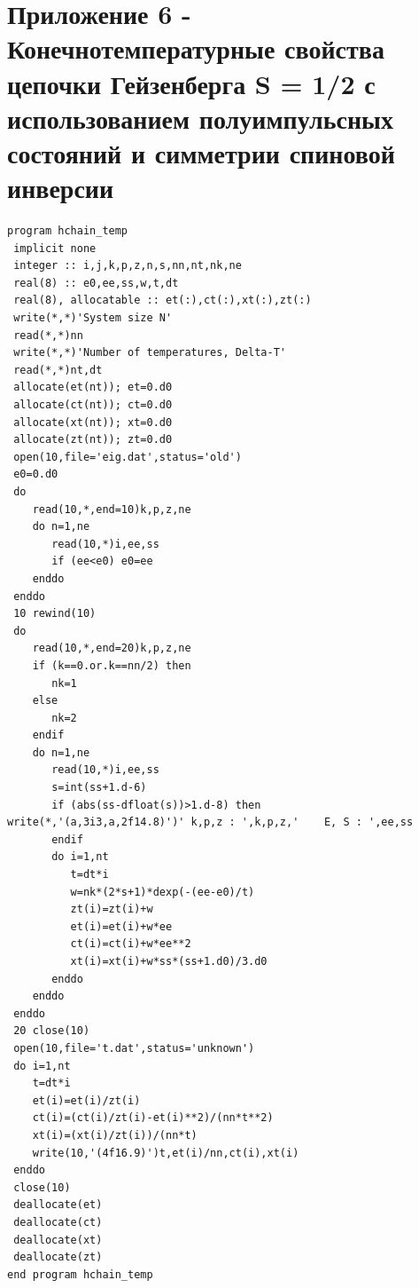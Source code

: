 \documentclass[11pt]{article}
\begin{document}
\section{Приложение 6 - Конечнотемпературные свойства цепочки Гейзенберга S = 1/2 с использованием полуимпульсных состояний и симметрии спиновой инверсии }

\begin{lstlisting}
program hchain_temp
 implicit none
 integer :: i,j,k,p,z,n,s,nn,nt,nk,ne
 real(8) :: e0,ee,ss,w,t,dt
 real(8), allocatable :: et(:),ct(:),xt(:),zt(:)
 write(*,*)'System size N'
 read(*,*)nn
 write(*,*)'Number of temperatures, Delta-T'
 read(*,*)nt,dt
 allocate(et(nt)); et=0.d0
 allocate(ct(nt)); ct=0.d0
 allocate(xt(nt)); xt=0.d0
 allocate(zt(nt)); zt=0.d0
 open(10,file='eig.dat',status='old')
 e0=0.d0
 do
    read(10,*,end=10)k,p,z,ne
    do n=1,ne
       read(10,*)i,ee,ss
       if (ee<e0) e0=ee
    enddo
 enddo
 10 rewind(10)
 do
    read(10,*,end=20)k,p,z,ne
    if (k==0.or.k==nn/2) then
       nk=1
    else
       nk=2
    endif
    do n=1,ne
       read(10,*)i,ee,ss
       s=int(ss+1.d-6)
       if (abs(ss-dfloat(s))>1.d-8) then
write(*,'(a,3i3,a,2f14.8)')' k,p,z : ',k,p,z,'    E, S : ',ee,ss
       endif
       do i=1,nt
          t=dt*i
          w=nk*(2*s+1)*dexp(-(ee-e0)/t)
          zt(i)=zt(i)+w
          et(i)=et(i)+w*ee
          ct(i)=ct(i)+w*ee**2
          xt(i)=xt(i)+w*ss*(ss+1.d0)/3.d0
       enddo
    enddo
 enddo
 20 close(10)
 open(10,file='t.dat',status='unknown')
 do i=1,nt
    t=dt*i
    et(i)=et(i)/zt(i)
    ct(i)=(ct(i)/zt(i)-et(i)**2)/(nn*t**2)
    xt(i)=(xt(i)/zt(i))/(nn*t)
    write(10,'(4f16.9)')t,et(i)/nn,ct(i),xt(i)
 enddo
 close(10)
 deallocate(et)
 deallocate(ct)
 deallocate(xt)
 deallocate(zt)
end program hchain_temp
\end{lstlisting}
\end{document}
